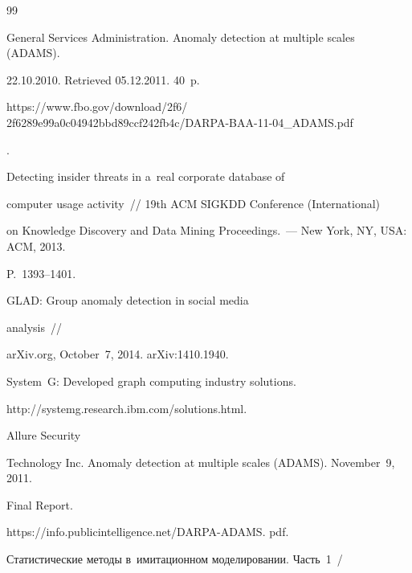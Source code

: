 {\small\frenchspacing


{%




\begin{thebibliography}{99}





\vspace*{-3pt}







 General Services Administration. Anomaly detection at multiple scales (ADAMS).


22.10.2010.  Retrieved 05.12.2011. 40~p. {\sf 


https://www.fbo.gov/download/2f6/ 2f6289e99a0c04942bbd89ccf242fb4c/DARPA-BAA-11-04\_ADAMS.pdf}.




 Detecting insider threats in a~real corporate database of 


computer usage activity~/\!\!/ 19th ACM SIGKDD Conference (International)


on Knowledge  Discovery and Data Mining Proceedings.~--- New York, NY, USA: ACM, 2013. 


P.~1393--1401.




 GLAD: Group anomaly detection in social media 


analysis~/\!\!/ 


arXiv.org,  October~7, 2014. arXiv:1410.1940.




System~G: Developed graph computing industry solutions. 


{\sf http://systemg.\linebreak research.ibm.com/solutions.html}.




 Allure Security 


Technology Inc. Anomaly detection at multiple scales (ADAMS). November~9, 2011.   


Final Report.


{\sf https://info.publicintelligence.net/DARPA-ADAMS. pdf}.




 Статистические методы в~имитационном моделировании. Часть~1~/



\end{thebibliography}}}
